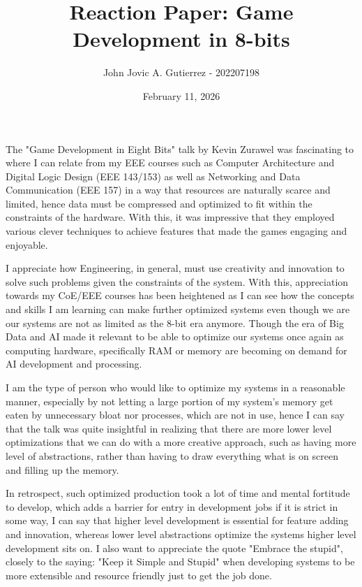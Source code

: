 \documentclass[12pt]{article}
\title{Reaction Paper: Game Development in 8-bits}
\author{John Jovic A. Gutierrez - 202207198}
\date{February 11, 2026}
\begin{document}
\maketitle
\thispagestyle{empty}

The "Game Development in Eight Bits" talk by Kevin Zurawel was fascinating to where I can relate from my EEE courses such as Computer Architecture and Digital Logic Design (EEE 143/153) as well as Networking and Data Communication (EEE 157) in a way that resources are naturally scarce and limited, hence data must be compressed and optimized to fit within the constraints of the hardware. With this, it was impressive that they employed various clever techniques to achieve features that made the games engaging and enjoyable.

I appreciate how Engineering, in general, must use creativity and innovation to solve such problems given the constraints of the system. With this, appreciation towards my CoE/EEE courses has been heightened as I can see how the concepts and skills I am learning can make further optimized systems even though we are our systems are not as limited as the 8-bit era anymore. Though the era of Big Data and AI made it relevant to be able to optimize our systems once again as computing hardware, specifically RAM or memory are becoming on demand for AI development and processing.

I am the type of person who would like to optimize my systems in a reasonable manner, especially by not letting a large portion of my system's memory get eaten by unnecessary bloat nor processes, which are not in use, hence I can say that the talk was quite insightful in realizing that there are more lower level optimizations that we can do with a more creative approach, such as having more level of abstractions, rather than having to draw everything what is on screen and filling up the memory.

In retrospect, such optimized production took a lot of time and mental fortitude to develop, which adds a barrier for entry in development jobs if it is strict in some way, I can say that higher level development is essential for feature adding and innovation, whereas lower level abstractions optimize the systems higher level development sits on. I also want to appreciate the quote "Embrace the stupid", closely to the saying: "Keep it Simple and Stupid" when developing systems to be more extensible and resource friendly just to get the job done.
\end{document}

